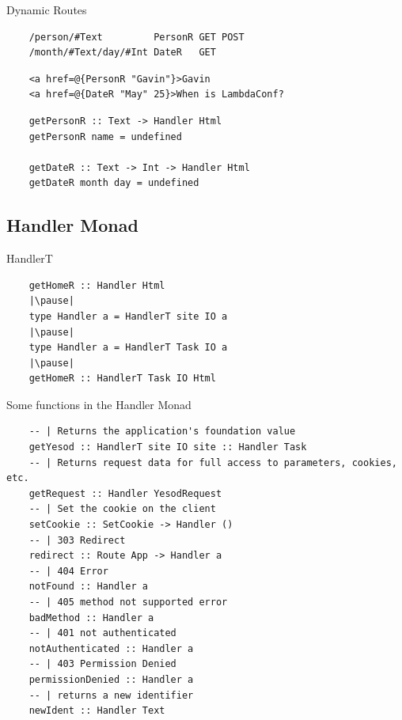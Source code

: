 \documentclass[pdf]{beamer}
\begin{document}
\begin{frame}[fragile]{Dynamic Routes}
  \begin{verbatim}
    /person/#Text         PersonR GET POST
    /month/#Text/day/#Int DateR   GET
  \end{verbatim}
  \pause
  \begin{verbatim}
    <a href=@{PersonR "Gavin"}>Gavin
    <a href=@{DateR "May" 25}>When is LambdaConf?
  \end{verbatim}
  \pause
  \begin{verbatim}
    getPersonR :: Text -> Handler Html
    getPersonR name = undefined

    getDateR :: Text -> Int -> Handler Html
    getDateR month day = undefined
  \end{verbatim}
\end{frame}

\subsection{Handler Monad}
\begin{frame}[fragile]{HandlerT}
  \begin{verbatim}
    getHomeR :: Handler Html
    |\pause|
    type Handler a = HandlerT site IO a
    |\pause|
    type Handler a = HandlerT Task IO a
    |\pause|
    getHomeR :: HandlerT Task IO Html
  \end{verbatim}
\end{frame}

\begin{frame}[fragile]{Some functions in the Handler Monad}
  \begin{verbatim}
    -- | Returns the application's foundation value
    getYesod :: HandlerT site IO site :: Handler Task
    -- | Returns request data for full access to parameters, cookies, etc.
    getRequest :: Handler YesodRequest
    -- | Set the cookie on the client
    setCookie :: SetCookie -> Handler ()
    -- | 303 Redirect
    redirect :: Route App -> Handler a
    -- | 404 Error
    notFound :: Handler a
    -- | 405 method not supported error
    badMethod :: Handler a
    -- | 401 not authenticated
    notAuthenticated :: Handler a
    -- | 403 Permission Denied
    permissionDenied :: Handler a
    -- | returns a new identifier
    newIdent :: Handler Text
  \end{verbatim}
\end{frame}
\end{document}
